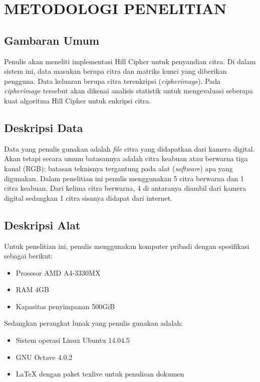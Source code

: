 \chapter{METODOLOGI PENELITIAN}

%
\vspace{12pt}
\section{Gambaran Umum}
Penulis akan meneliti implementasi Hill Cipher untuk penyandian citra. Di dalam 
sistem ini, data masukan berupa citra dan matriks kunci yang diberikan pengguna.
Data keluaran berupa citra terenkripsi (\emph{cipherimage}). Pada \emph{cipherimage}
tersebut akan dikenai analisis statistik untuk mengevaluasi seberapa kuat algoritma
Hill Cipher untuk enkripsi citra.
\section{Deskripsi Data}
Data yang penulis gunakan adalah \textit{file} citra yang didapatkan dari kamera
digital. Akan tetapi secara umum batasannya adalah citra keabuan atau berwarna 
tiga kanal (RGB); batasan teknisnya tergantung pada alat (\textit{software}) 
apa yang digunakan.
Dalam penelitian ini penulis menggunakan 5 citra berwarna dan 1 citra keabuan.
Dari kelima citra berwarna, 4 di antaranya diambil dari kamera digital sedangkan 1 citra sisanya
didapat dari internet.

\section{Deskripsi Alat}
Untuk penelitian ini, penulis menggunakan komputer pribadi dengan spesifikasi sebagai berikut:
\begin{itemize}
\item Prosesor AMD A4-3330MX
\item RAM 4GB
\item Kapasitas penyimpanan 500GiB
\end{itemize}
Sedangkan perangkat lunak yang penulis gunakan adalah:
\begin{itemize}
\item Sistem operasi Linux Ubuntu 14.04.5
\item GNU Octave 4.0.2
\item {\LaTeX} dengan paket texlive untuk penulisan dokumen
\end{itemize}

